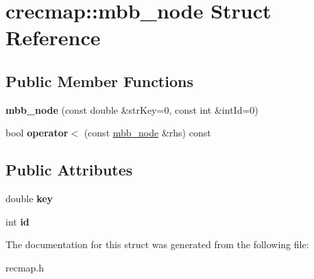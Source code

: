 \hypertarget{structcrecmap_1_1mbb__node}{\section{crecmap\+:\+:mbb\+\_\+node Struct Reference}
\label{structcrecmap_1_1mbb__node}
}
\subsection*{Public Member Functions}
\begin{DoxyCompactItemize}
\item 
\hypertarget{structcrecmap_1_1mbb__node_a74749cee5a8b35777ec9bb7d967b2050}{{\bfseries mbb\+\_\+node} (const double \&str\+Key=0, const int \&int\+Id=0)}\label{structcrecmap_1_1mbb__node_a74749cee5a8b35777ec9bb7d967b2050}

\item 
\hypertarget{structcrecmap_1_1mbb__node_a9be94f8ce6bef4b6d17f94a309622d20}{bool {\bfseries operator$<$} (const \hyperlink{structcrecmap_1_1mbb__node}{mbb\+\_\+node} \&rhs) const }\label{structcrecmap_1_1mbb__node_a9be94f8ce6bef4b6d17f94a309622d20}

\end{DoxyCompactItemize}
\subsection*{Public Attributes}
\begin{DoxyCompactItemize}
\item 
\hypertarget{structcrecmap_1_1mbb__node_a17fd42b192941d75a018fcd8221535f9}{double {\bfseries key}}\label{structcrecmap_1_1mbb__node_a17fd42b192941d75a018fcd8221535f9}

\item 
\hypertarget{structcrecmap_1_1mbb__node_a3fa0677553f7e9971593cd65a295d78c}{int {\bfseries id}}\label{structcrecmap_1_1mbb__node_a3fa0677553f7e9971593cd65a295d78c}

\end{DoxyCompactItemize}


The documentation for this struct was generated from the following file\+:\begin{DoxyCompactItemize}
\item 
recmap.\+h\end{DoxyCompactItemize}
